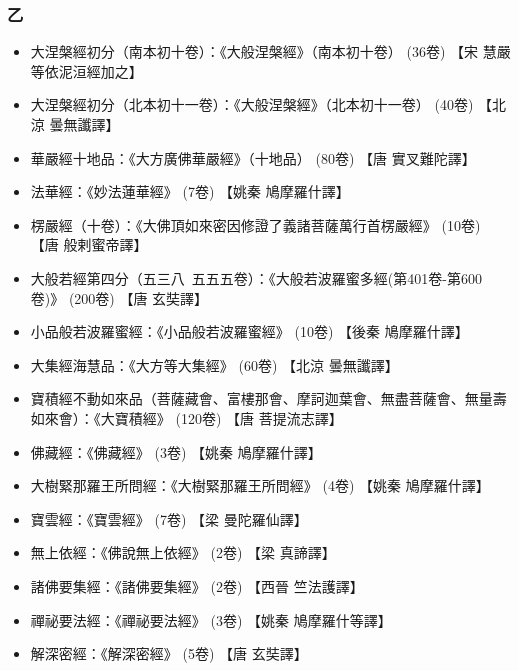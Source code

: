 \subsubsection{乙}
\begin{itemize}
  \item 大涅槃經初分（南本初十卷）：《大般涅槃經》（南本初十卷） (36卷) 【宋 慧嚴等依泥洹經加之】
  \item 大涅槃經初分（北本初十一卷）：《大般涅槃經》（北本初十一卷） (40卷) 【北涼 曇無讖譯】
  \item 華嚴經十地品：《大方廣佛華嚴經》（十地品） (80卷) 【唐 實叉難陀譯】
  \item 法華經：《妙法蓮華經》 (7卷) 【姚秦 鳩摩羅什譯】
  \item 楞嚴經（十卷）：《大佛頂如來密因修證了義諸菩薩萬行首楞嚴經》 (10卷) 【唐 般剌蜜帝譯】
  \item 大般若經第四分（五三八~五五五卷）：《大般若波羅蜜多經(第401卷-第600卷)》 (200卷) 【唐 玄奘譯】
  \item 小品般若波羅蜜經：《小品般若波羅蜜經》 (10卷) 【後秦 鳩摩羅什譯】
  \item 大集經海慧品：《大方等大集經》 (60卷) 【北涼 曇無讖譯】
  \item 寶積經不動如來品（菩薩藏會、富樓那會、摩訶迦葉會、無盡菩薩會、無量壽如來會）：《大寶積經》 (120卷) 【唐 菩提流志譯】
  \item 佛藏經：《佛藏經》 (3卷) 【姚秦 鳩摩羅什譯】
  \item 大樹緊那羅王所問經：《大樹緊那羅王所問經》 (4卷) 【姚秦 鳩摩羅什譯】
  \item 寶雲經：《寶雲經》 (7卷) 【梁 曼陀羅仙譯】
  \item 無上依經：《佛說無上依經》 (2卷) 【梁 真諦譯】
  \item 諸佛要集經：《諸佛要集經》 (2卷) 【西晉 竺法護譯】
  \item 禪祕要法經：《禪祕要法經》 (3卷) 【姚秦 鳩摩羅什等譯】
  \item 解深密經：《解深密經》 (5卷) 【唐 玄奘譯】
\end{itemize}
